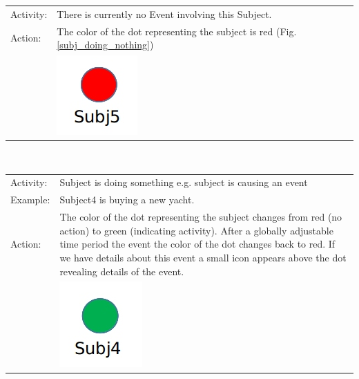 \begin{tabularx}{\textwidth}{l X}
Activity: & There is currently no Event involving this Subject.\\
Action: & The color of the dot representing the subject is red (Fig.\ref{subj_doing_nothing})\\
& \includegraphics[scale=0.3]{./img/visualization/subj_doing_nothing.png}\label{subj_doing_nothing}\\
\end{tabularx}\\

\begin{tabularx}{\textwidth}{l X}
Activity: & Subject is doing something e.g. subject is causing an event\\
Example: & Subject4 is buying a new yacht. \\
Action: & The color of the dot representing the subject changes from red (no action) to green (indicating activity). After a globally adjustable time period the event the color of the dot changes back to red. If we have details about this event a small icon appears above the dot  revealing details of the event.\\ 
& \includegraphics[scale=0.3]{./img/visualization/subj_doing_sth.png}\\
\end{tabularx}\\



